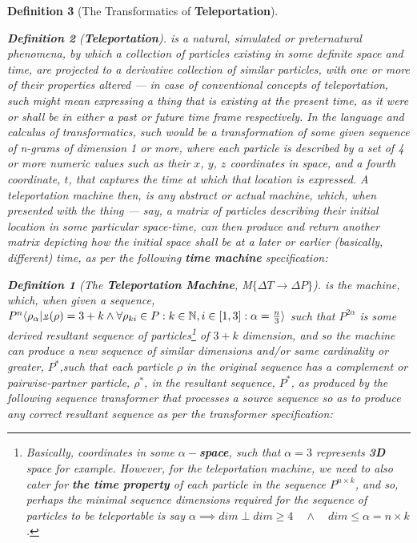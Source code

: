 \documentclass[a4paper, 18pt]{book} %
\newtheorem{defn}{Definition}
\newcommand{\invpi}{\rotatebox[origin=c]{180}{$\pi$}}
\begin{document}
\begin{appendices}
\begin{defn}[The Transformatics of \textbf{Teleportation}]
\begin{defn}[\textbf{Teleportation}] is a natural, simulated or preternatural phenomena, by which a collection of particles existing in some definite space and time, are projected to a derivative collection of similar particles, with one or more of their properties altered --- in case of conventional concepts of teleportation, such might mean expressing \textit{a thing} that is existing at the present time, as it were or shall be in either a past or future time frame respectively. In the language and calculus of transformatics, such would be a transformation of some given sequence of \textit{n}-grams of dimension 1 or more, where each particle is described by a set of 4 or more numeric values such as their $x$, $y$, $z$ coordinates in space, and a fourth coordinate, $t$, that captures the time at which that location is expressed. A teleportation machine then, is any abstract or \textit{actual} machine, which, when presented with the \textit{thing} --- say, a matrix of particles describing their initial location in some particular space-time, can then produce and return another matrix depicting how the initial space shall be at a later or earlier (basically, different) time, as per the following \textbf{time machine} specification:

\begin{defn}[The \textbf{Teleportation Machine}, M$\{\Delta T \rightarrow \Delta P\}$] 
is the machine, which, when given a sequence, $P^n\langle \rho_\alpha | \invpi(\rho) = 3+k \land \forall \rho_{ki} \in P : k \in \mathbb{N}, i \in [1,3] : \alpha = \frac{n}{3} \rangle$ such that $P^{2\alpha}$ is some derived resultant sequence of particles\footnote{Basically, coordinates in some \textbf{$\alpha-$space}, such that $\alpha = 3$ represents \textbf{3D} space for example. However, for the teleportation machine, we need to also cater for \textbf{the time property} of each particle in the sequence $P^{n\times k}$, and so, perhaps the minimal sequence dimensions required for the sequence of particles to be \textit{teleportable} is say $\alpha \implies dim \perp dim \geq 4 \quad \land \quad dim \leq \alpha = n \times k$.} of $3+k$ dimension, and so the machine can produce a new sequence of similar dimensions and/or same cardinality or greater, $P^*$,such that each particle $\rho$ in the original sequence has a complement or pairwise-partner particle, $\rho^*$, in the resultant sequence, $P^*$, as produced by the following sequence transformer that processes a source sequence so as to produce any correct resultant sequence as per the transformer specification:


\end{defn}
\end{defn}
\end{defn}
\end{appendices}
\end{document}
